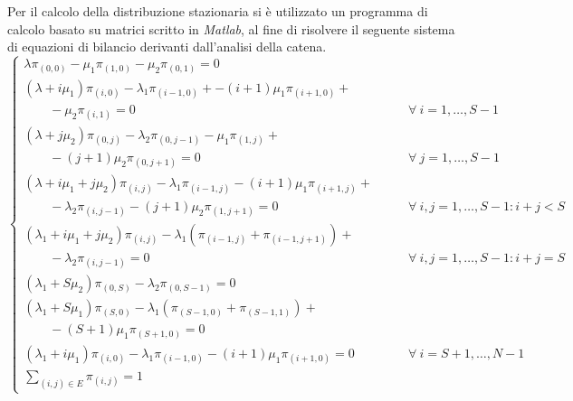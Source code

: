 Per il calcolo della distribuzione stazionaria si è utilizzato un programma di
calcolo basato su matrici scritto in \emph{Matlab}, al fine di risolvere il
seguente sistema di equazioni di bilancio derivanti dall'analisi della catena.
%
\begin{displaymath}
\left\{ \begin{array}{ll}

\lambda \pi_{(0,0)} - \mu_1 \pi_{(1,0)} -\mu_{2} \pi_{(0,1)} = 0 & \\[4pt]

(\lambda+i\mu_1)\pi_{(i,0)} - \lambda_1\pi_{(i-1,0)} + - (i+1)\mu_1\pi_{(i+1,0)}
+ &\\
\qquad - \mu_2\pi_{(i,1)} = 0 & 
\qquad \forall \ i = 1, \ldots, S-1  \\[4pt]  

(\lambda+j\mu_2)\pi_{(0,j)} - \lambda_2\pi_{(0,j-1)} - \mu_1\pi_{(1,j)} + &\\
\qquad-(j+1)\mu_2\pi_{(0,j+1)} = 0 & 
\qquad \forall \ j = 1, \ldots, S-1 \\[4pt]

(\lambda+i\mu_1+j\mu_2)\pi_{(i,j)} - \lambda_1\pi_{(i-1,j)} -
(i+1)\mu_1\pi_{(i+1,j)}+ &\\
\qquad - \lambda_2\pi_{(i,j-1)} -(j+1)\mu_2\pi_{(1,j+1)} = 0 & \qquad \forall \
  i,j=1,\ldots,S-1 : i+j < S \\[4pt]

(\lambda_1+i\mu_1+j\mu_2)\pi_{(i,j)} - \lambda_1(\pi_{(i-1,j)}+\pi_{(i-1,j+1)})
+ &\\
\qquad - \lambda_2\pi_{(i,j-1)} = 0 & 
\qquad \forall \ i,j=1,\ldots,S-1 : i+j = S \\[4pt]

(\lambda_1+S\mu_2)\pi_{(0,S)} - \lambda_2\pi_{(0,S-1)} = 0 & \\[4pt]

(\lambda_1+S\mu_1)\pi_{(S,0)} - \lambda_1(\pi_{(S-1,0)}+\pi_{(S-1,1)}) + &\\
\qquad -(S+1)\mu_1\pi_{(S+1,0)} = 0 & \\[4pt]

(\lambda_1+i\mu_1)\pi_{(i,0)} - \lambda_1\pi_{(i-1,0)} - (i+1)\mu_1\pi_{(i+1,0)}
= 0 & \qquad \forall \ i = S+1,\ldots,N-1 \\[4pt]

\sum_{(i,j) \in E} \pi_{(i,j)} = 1 & 

\end{array} \right .
\end{displaymath}

